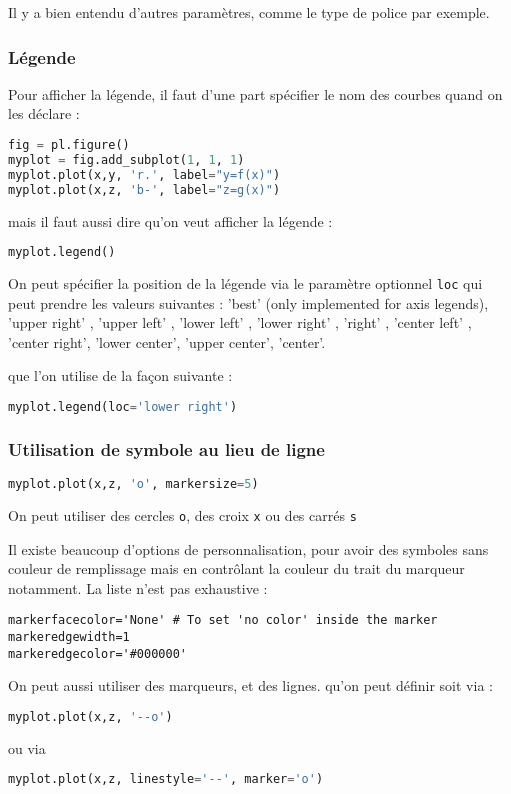 \documentclass[a4paper,twoside]{article}
\begin{document}
Il y a bien entendu d'autres paramètres, comme le type de police par exemple.

\subsubsection{Légende}
Pour afficher la légende, il faut d'une part spécifier le nom des courbes quand on les déclare : 
\begin{lstlisting}[language=python]
fig = pl.figure()
myplot = fig.add_subplot(1, 1, 1)
myplot.plot(x,y, 'r.', label="y=f(x)")
myplot.plot(x,z, 'b-', label="z=g(x)")
\end{lstlisting}
mais il faut aussi dire qu'on veut afficher la légende :
\begin{lstlisting}[language=python]
myplot.legend()
\end{lstlisting}

\bigskip

On peut spécifier la position de la légende via le paramètre optionnel \texttt{loc} qui peut prendre les valeurs suivantes :
'best' (only implemented for axis legends), 'upper right' , 'upper left' , 'lower left' , 'lower right' , 'right' , 'center left' , 'center right', 'lower center', 'upper center', 'center'.

que l'on utilise de la façon suivante :
 \begin{lstlisting}[language=python]
myplot.legend(loc='lower right')
\end{lstlisting}


\subsubsection{Utilisation de symbole au lieu de ligne}
\begin{lstlisting}[language=python]
myplot.plot(x,z, 'o', markersize=5)
\end{lstlisting}
On peut utiliser des cercles \texttt{o}, des croix \texttt{x} ou des carrés \texttt{s}

Il existe beaucoup d'options de personnalisation, pour avoir des symboles sans couleur de remplissage mais en contrôlant la couleur du trait du marqueur notamment. La liste n'est pas exhaustive : 
\begin{verbatim}
markerfacecolor='None' # To set 'no color' inside the marker
markeredgewidth=1
markeredgecolor='#000000'
\end{verbatim}

\bigskip

On peut aussi utiliser des marqueurs, et des lignes. qu'on peut définir soit via :
\begin{lstlisting}[language=python]
myplot.plot(x,z, '--o')
\end{lstlisting}
ou via
\begin{lstlisting}[language=python]
myplot.plot(x,z, linestyle='--', marker='o')
\end{lstlisting}
\end{document}
